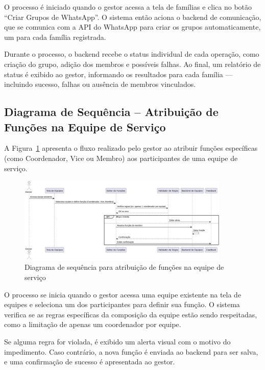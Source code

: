O processo é iniciado quando o gestor acessa a tela de famílias e clica no botão “Criar Grupos de WhatsApp”. O sistema então aciona o backend de comunicação, que se comunica com a API do WhatsApp para criar os grupos automaticamente, um para cada família registrada.

Durante o processo, o backend recebe o status individual de cada operação, como criação do grupo, adição dos membros e possíveis falhas. Ao final, um relatório de status é exibido ao gestor, informando os resultados para cada família — incluindo sucesso, falhas ou ausência de membros vinculados.

\subsection{Diagrama de Sequência – Atribuição de Funções na Equipe de Serviço}

A Figura~\ref{fig:teamRoleAssign} apresenta o fluxo realizado pelo gestor ao atribuir funções específicas (como Coordenador, Vice ou Membro) aos participantes de uma equipe de serviço.

\begin{figure}[H]
    \centering
    \includegraphics[width=0.9\textwidth]{images/diagramasdesequencias/teamAtribuition.png}
    \caption{Diagrama de sequência para atribuição de funções na equipe de serviço}
    \label{fig:teamRoleAssign}
\end{figure}

O processo se inicia quando o gestor acessa uma equipe existente na tela de equipes e seleciona um dos participantes para definir sua função. O sistema verifica se as regras específicas da composição da equipe estão sendo respeitadas, como a limitação de apenas um coordenador por equipe.

Se alguma regra for violada, é exibido um alerta visual com o motivo do impedimento. Caso contrário, a nova função é enviada ao backend para ser salva, e uma confirmação de sucesso é apresentada ao gestor.


